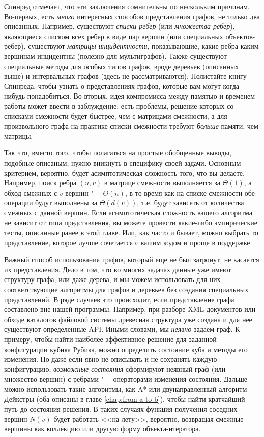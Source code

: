 Спинред отмечает, что эти заключения сомнительны по нескольким причинам. Во-первых, есть \textit{много} интересных способов представления графов, не только два описанных. Например, существуют \textit{списки ребер} (или \textit{множества ребер}), являющиеся списком всех ребер в виде пар вершин (или специальных объектов-ребер), существуют \textit{матрицы инцидентности}, показывающие, какие ребра каким вершинам инцидентны (полезно для мультиграфов). Также существуют специальные методы для особых типов графов, вроде деревьев (описанных выше) и интервальных графов (здесь не рассматриваются). Полистайте книгу Спинреда, чтобы узнать о представлениях графов, которые вам могут когда-нибудь понадобиться.
Во-вторых, идея компромисса между памятью и временем работы может ввести в заблуждение: есть проблемы, решение которых со списками смежности будет быстрее, чем с матрицами смежности, а для произвольного графа на практике списки смежности требуют \textit{больше} памяти, чем матрицы.

Так что, вместо того, чтобы полагаться на простые обобщенные выводы, подобные описаным, нужно вникнуть в специфику своей задачи. Основным критерием, вероятно, будет асимптотическая сложность того, что вы делаете. Например, поиск ребра $(u, v)$ в матрице смежности выполняется за $\Theta(1)$, а обход смежных с $v$ вершин "--- $\Theta(n)$, в то время как на списке смежности обе операции будут выполнены за $\Theta(d(v))$, т.е. будут зависеть от количества смежных с данной вершин. 
Если асимптотическая сложность вашего алгоритма не зависит от типа представления, вы можете провести какие-либо эмпирические тесты, описанные ранее в этой главе. Или, как часто и бывает, можно выбрать то представление, которое лучше сочетается с вашим кодом и проще в поддержке.

Важный способ использования графов, который еще не был затронут, не касается их представления. Дело в том, что во многих задачах данные уже имеют структуру графа, или даже дерева, и мы можем использовать для них соответствующие алгоритмы для графов и деревьев без создания специальных представлений. В ряде случаев это происходит, если представление графа составлено вне нашей программы. Например, при разборе XML-документов или обходе каталогов файловой системы древесная структура уже создана и для нее существуют определенные API. Иными словами, мы \textit{неявно} задаем граф. К примеру, чтобы найти наиболее эффективное решение для заданной конфигурации кубика Рубика, можно определить состояние куба и методы его изменения. Но даже если явно не описывать и не сохранять каждую конфигурацию, \textit{возможные состояния} сформируют неявный граф (или множество вершин) с ребрами "--- операторами изменения состояния. Дальше можно использовать такие алгоритмы, как A* или двунаправленный алгоритм Дейкстры (оба описаны в главе \ref{chap:from-a-to-b}), чтобы найти кратчайший путь до состояния решения. В таких случаях функция получения соседних вершин $N(v)$ будет работать <<на лету>>, вероятно, возвращая смежные вершины как коллекцию или другую форму объекта-итератора.

